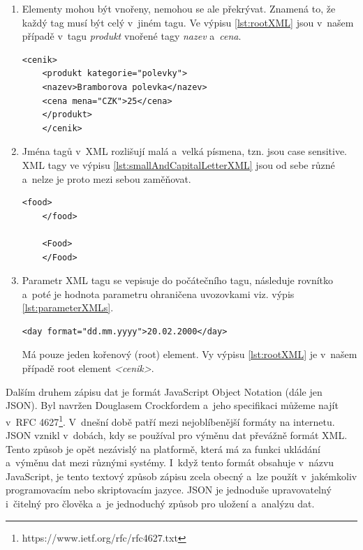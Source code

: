 \begin{enumerate}
	\item Elementy mohou být vnořeny, nemohou se ale překrývat. Znamená to, že každý tag musí být celý v~jiném tagu. Ve výpisu \ref{lst:rootXML} jsou v~našem případě v~tagu \textit{produkt} vnořené tagy \textit{nazev} a~\textit{cena}. 
	
	\pagebreak
	
	\begin{lstlisting}[numbers=none, caption=Ukázka kořenového elementu XML dokumentu., label=lst:rootXML]
	<cenik>
	<produkt kategorie="polevky">
	<nazev>Bramborova polevka</nazev>
	<cena mena="CZK">25</cena>
	</produkt>
	</cenik>
	\end{lstlisting}
	
	\item Jména tagů v~XML rozlišují malá a~velká písmena, tzn. jsou case sensitive. XML tagy ve výpisu \ref{lst:smallAndCapitalLetterXML} jsou od sebe různé a~nelze je proto mezi sebou zaměňovat. \\
	
	\begin{lstlisting}[numbers=none, caption=Malá písmena a~velká písmena v~XML, label=lst:smallAndCapitalLetterXML]
	<food>
	</food>		
	
	<Food>
	</Food>		
	\end{lstlisting}
	
	\item 
	Parametr XML tagu se vepisuje do počátečního tagu, následuje rovnítko a~poté je hodnota parametru ohraničena uvozovkami viz. výpis \ref{lst:parameterXMLs}. \\
	
	\begin{lstlisting}[numbers=none, caption=Parametr XML tagu, label=lst:parameterXMLs]
	<day format="dd.mm.yyyy">20.02.2000</day>
	\end{lstlisting}
	
	Má pouze jeden kořenový (root) element. Vy výpisu \ref{lst:rootXML} je v~našem případě root element \textit{<cenik>}.\cite{9} \\
\end{enumerate}





Dalším druhem zápisu dat je formát JavaScript Object Notation (dále jen JSON). Byl navržen Douglasem Crockfordem a~jeho specifikaci můžeme najít v~RFC 4627\footnote{https://www.ietf.org/rfc/rfc4627.txt}. V~dnešní době patří mezi nejoblíbenější formáty na internetu. JSON vznikl v~dobách, kdy se používal pro výměnu dat převážně formát XML. Tento způsob je opět nezávislý na platformě, která má za funkci ukládání a~výměnu dat mezi různými systémy. I~když tento formát obsahuje v~názvu JavaScript, je tento textový způsob zápisu zcela obecný a~lze použít v~jakémkoliv programovacím nebo skriptovacím jazyce. JSON je jednoduše upravovatelný i~čitelný pro člověka a~je jednoduchý způsob pro uložení a~analýzu dat. 
 
